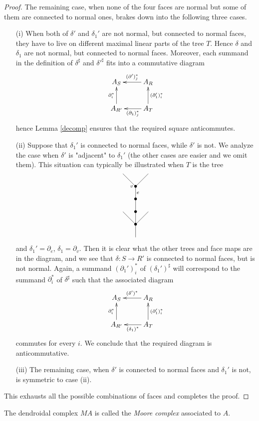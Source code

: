 \documentclass[a4paper]{amsart}
\theoremstyle{plain}
\theoremstyle{definition}
\theoremstyle{remark}
\newcommand{\To}{\longrightarrow}
\numberwithin{equation}{section}
\numberwithin{figure}{section}
\begin{document}
\begin{proof}
The remaining case, when none of the four faces are normal but some of them are connected to normal ones, brakes down into the following three cases.
\begin{itemize}
\item[{\rm (i)}] When both of $\delta'$ and $\delta_1'$ are not normal, but connected to normal faces, they have to live on different maximal linear parts of the tree $T$. Hence $\delta$ and $\delta_1$ are not  normal, but connected to normal faces. Moreover, each summand in the definition of $ \delta^\sharp$ and $\delta'^\sharp$ fits into a commutative diagram
\[
\xymatrix{A_S &A_R\ar[l]_-{(\partial')_j^*}\\
A_{R'}\ar[u]^{\partial_i^*} &A_T\ar[l]^-{(\partial_1)_j^*}\ar[u]_{(\partial_1')_i^*}}
\]
hence Lemma \ref{decomp} ensures that the required square anticommutes.
\item[{\rm (ii)}] Suppose that $\delta_1'$ is connected to normal faces, while $\delta'$ is not. We analyze the case when $\delta'$ is "adjacent" to $\delta_1'$ (the other cases are easier and we omit them). This situation can typically be illustrated when $T$ is the tree
\[
\xy<0.08cm,0cm>:
(0,0)*=0{}="1";
(0,8)*=0{\bullet}="2";
(-8,16)*=0{}="3";
(0,16)*=0{\bullet}="4";
(8,16)*=0{}="5";
(0,24)*=0{\bullet}="6";
(0,32)*=0{\bullet}="7";
(-8,40)*=0{}="8";
(8,40)*=0{}="9";
(-2.5,32)*{\scriptstyle v};
(1.5,28)*{\scriptstyle e};
"1";"2" **\dir{-};
"2";"3" **\dir{-};
"2";"4" **\dir{-};
"2";"5" **\dir{-};
"4";"6" **\dir{-};
"6";"7" **\dir{-};
"7";"8" **\dir{-};
"7";"9" **\dir{-};
\endxy
\]
and $\delta_1'=\partial_e$, $\delta_1=\partial_v$. Then it is clear what the other trees and face maps are in the diagram, and we see that $\delta\colon S\To R'$ is connected to normal faces, but is not normal. Again, a summand $(\partial_1')^*_i$ of $(\delta_1')^\sharp$ will correspond to the summand $\partial_i^*$ of $\delta^\sharp$ such that the associated diagram
\[
\xymatrix{A_S &A_R\ar[l]_-{(\delta')^*}\\
A_{R'}\ar[u]^{\partial_i^*} &A_T\ar[l]^-{(\delta_1)^*}\ar[u]_{(\partial_1')_i^*}}
\]
commutes for every $i$. We conclude that the required diagram is anticommutative.
\item[{\rm (iii)}] The remaining case, when $\delta'$ is connected to normal faces and $\delta_1'$ is not, is symmetric to case (ii).
\end{itemize}
This exhausts all the possible combinations of faces and completes the proof.
\end{proof}
The dendroidal complex $MA$ is called the \emph{Moore complex} associated to $A$.
\end{document}
